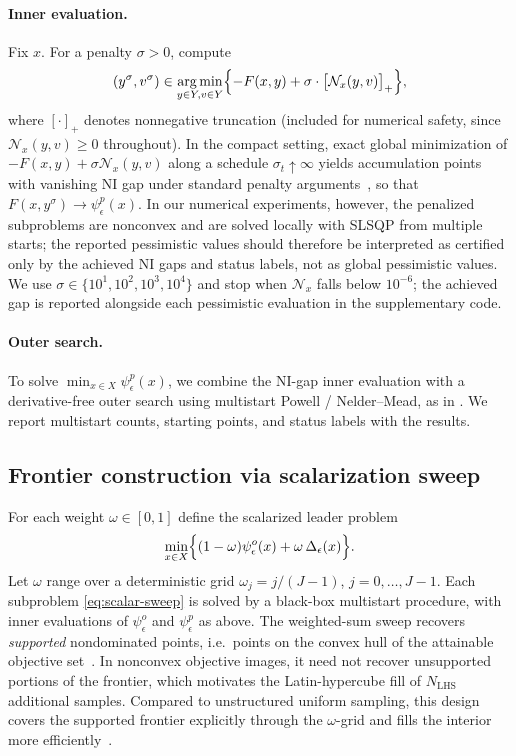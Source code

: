 \documentclass[11pt]{article}
\theoremstyle{definition}
\newcommand{\eps}{\epsilon}
\DeclareMathOperator*{\argmin}{arg\,min}
\begin{document}
\paragraph{Inner evaluation.}
Fix $x$. For a penalty $\sigma>0$, compute
\begin{equation}\label{eq:ni-penalty}
  (y^\sigma,v^\sigma)
  \in\argmin_{y\in Y,v\in Y}
  \Bigl\{-F(x,y)+\sigma\cdot\bigl[\mathcal N_x(y,v)\bigr]_+\Bigr\},
\end{equation}
where $[\cdot]_+$ denotes nonnegative truncation (included for
numerical safety, since $\mathcal N_x(y,v)\ge 0$ throughout).
In the compact setting, exact global minimization of $-F(x,y) + \sigma \mathcal{N}_x(y,v)$ along a schedule $\sigma_t\uparrow \infty$ yields accumulation points with vanishing NI gap under standard penalty arguments~\cite{fukushima1992equivalent,harker1991generalized,von2009optimization}, so that $F(x,y^\sigma)\to\psi_\eps^p(x)$.
In our numerical experiments, however, the penalized
subproblems are nonconvex and are solved locally with SLSQP from
multiple starts; the reported pessimistic values should
therefore be interpreted as certified only by the achieved NI
gaps and status labels, not as global pessimistic values. We use
$\sigma\in\{10^1,10^2,10^3,10^4\}$ and stop when $\mathcal N_x$
falls below $10^{-6}$; the achieved gap is reported alongside
each pessimistic evaluation in the supplementary code.

\paragraph{Outer search.}
To solve $\min_{x\in X}\psi_\eps^p(x)$, we combine the NI-gap
inner evaluation with a derivative-free outer search using
multistart Powell / Nelder--Mead, as in
\cite{conn2009introduction,audet2017derivative}. We report multistart
counts, starting points, and status labels with the results.

\subsection{Frontier construction via scalarization sweep}
\label{sec:algo-frontier}
For each weight $\omega\in[0,1]$ define the scalarized leader
problem
\begin{equation}\label{eq:scalar-sweep}
  \min_{x\in X}\Bigl\{(1-\omega)\psi_\eps^o(x)+\omega\,\Delta_\eps(x)\Bigr\}.
\end{equation}
Let $\omega$ range over a deterministic grid
$\omega_j=j/(J-1)$, $j=0,\dots,J-1$. 
Each subproblem \eqref{eq:scalar-sweep} is solved by a black-box multistart
procedure, with inner evaluations of $\psi_\eps^o$ and
$\psi_\eps^p$ as above. The weighted-sum sweep recovers
\emph{supported} nondominated points, i.e.\ points on the convex
hull of the attainable objective set~\cite{ehrgott2005multicriteria,
miettinen1999nonlinear}. In nonconvex objective images, it need not
recover unsupported portions of the frontier, which motivates
the Latin-hypercube fill of $N_\mathrm{LHS}$ additional samples.
Compared to unstructured uniform sampling, this design covers
the supported frontier explicitly through the $\omega$-grid and
fills the interior more efficiently~\cite{mckay2000comparison,
viana2016tutorial}.
\end{document}
